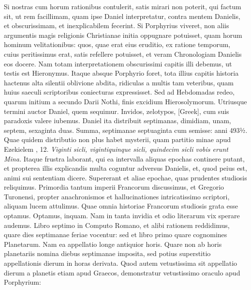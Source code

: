 Si nostras cum horum
rationibus contulerit, satis mirari non poterit, qui factum
sit, ut rem facillimam, quam ipse Daniel interpretatur, contra mentem
Danielis, et obscurissimam, et inexplicabilem fecerint.
Si Porphyrius
viveret, non aliis argumentis magis religionis Christianae
initia oppugnare potuisset, quam horum hominum velitationibus:
quos, quae erat eius eruditio, ex ratione temporum, cuius peritissimus
erat, satis refellere potuisset, et veram Chronologiam
Danielis eos docere.
Nam totam interpretationem obscurissimi
capitis  illi debemus, ut testis est Hieronymus.
Itaque
absque Porphyrio foret, tota illius capitis historia hactenus alta
silentii oblivione abdita, ridiculas a multis tam veteribus, quam huius
saeculi scriptoribus coniecturas expressisset.
Sed ad Hebdomadas
redeo, quarum initium a secundo Darii Nothi, finis excidium
Hierosolymorum.
Utriusque termini auctor Daniel, quem sequimur.
Invidos, zelotypos, \textgreek{[Greek]}, cum suis
 paradoxis valere iubemus.
Daniel ita distribuit septimanas, dimidiam, unam, septem,
sexaginta duas.
Summa, septimanae septuaginta cum semisse: anni
493½.
Quae quidem distributio non plus habet mysterii, quam
partitio minae apud Ezekielem , 12.
\textit{Viginti sicli, vigintiquinque
sicli, quindecim sicli vobis erunt Mina.}
Itaque frustra laborant,
qui ea intervalla aliquas epochas continere putant, et propterea
illis explicandis multa coguntur adversus Danielis, et, quod peius
est, animi sui sententiam dicere.
Supererant et aliae epochae, quas
prudentes studiosis reliquimus.
Primordia tantum imperii Francorum
discussimus, et Gregorio Turonensi, propter anachronismos
et hallucinationes intricatissimo scriptori, aliquam lucem attulimus.
Quae omnia historiae Francorum studiosis grata esse optamus.
Optamus, inquam.
Nam in tanta invidia et odio literarum
vix sperare audemus.
Libro septimo in Computo Romano, et alibi
rationem reddidimus, quare dies septimanae feriae vocentur: sed
et libro primo quare cognomines Planetarum.
Nam ea appellatio longe antiquior horis.
Quare non ab horis planetariis nomina diebus
septimanae imposita, sed potius superstitio appellationis dierum
in horas derivata.
Quod autem vetustissima sit appellatio dierum
a planetis etiam apud Graecos, demonstratur vetustissimo oraculo
apud Porphyrium:
